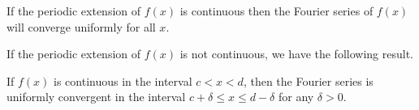 \begin{Result}
  If the periodic extension of $f(x)$ is continuous then the Fourier
  series of $f(x)$ will converge uniformly for all $x$.
\end{Result}



If the periodic extension of $f(x)$ is not continuous, we have the 
following result.

\begin{Result}
  If $f(x)$ is continuous in the interval $c < x < d$, then the Fourier
  series is uniformly convergent in the interval $c + \delta \leq x \leq
  d - \delta$ for any $\delta > 0$.
\end{Result}








